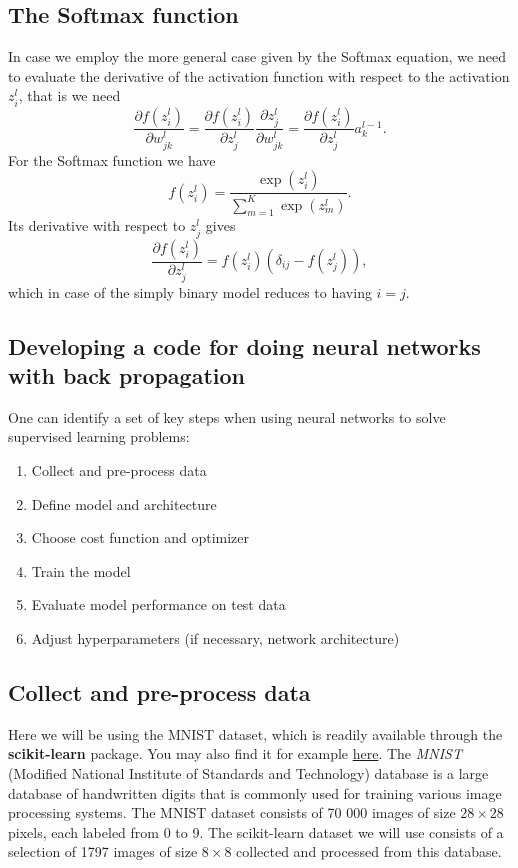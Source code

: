 \documentclass[%
oneside,                 %
final,                   %
10pt]{article}
\begin{document}
\subsection{The Softmax function}
In case we employ the more general case given by the Softmax equation, we need to evaluate the derivative of the activation function with respect to the activation $z_i^l$, that is we need
\[
\frac{\partial f(z_i^l)}{\partial w_{jk}^l} =
\frac{\partial f(z_i^l)}{\partial z_j^l} \frac{\partial z_j^l}{\partial w_{jk}^l}= \frac{\partial f(z_i^l)}{\partial z_j^l}a_k^{l-1}.
\]
For the Softmax function we have
\[
f(z_i^l) = \frac{\exp{(z_i^l)}}{\sum_{m=1}^K\exp{(z_m^l)}}.
\]
Its derivative with respect to $z_j^l$ gives 
\[
\frac{\partial f(z_i^l)}{\partial z_j^l}= f(z_i^l)\left(\delta_{ij}-f(z_j^l)\right), 
\]
which in case of the simply binary model reduces to  having $i=j$. 

\subsection{Developing a code for doing neural networks with back propagation}


One can identify a set of key steps when using neural networks to solve supervised learning problems:  

\begin{enumerate}
\item Collect and pre-process data  

\item Define model and architecture  

\item Choose cost function and optimizer  

\item Train the model  

\item Evaluate model performance on test data  

\item Adjust hyperparameters (if necessary, network architecture)
\end{enumerate}

\noindent
\subsection{Collect and pre-process data}

Here we will be using the MNIST dataset, which is readily available through the \textbf{scikit-learn}
package. You may also find it for example \href{{http://yann.lecun.com/exdb/mnist/}}{here}.  
The \emph{MNIST} (Modified National Institute of Standards and Technology) database is a large database
of handwritten digits that is commonly used for training various image processing systems.  
The MNIST dataset consists of 70 000 images of size $28\times 28$ pixels, each labeled from 0 to 9.  
The scikit-learn dataset we will use consists of a selection of 1797 images of size $8\times 8$ collected and processed from this database.  
\end{document}
